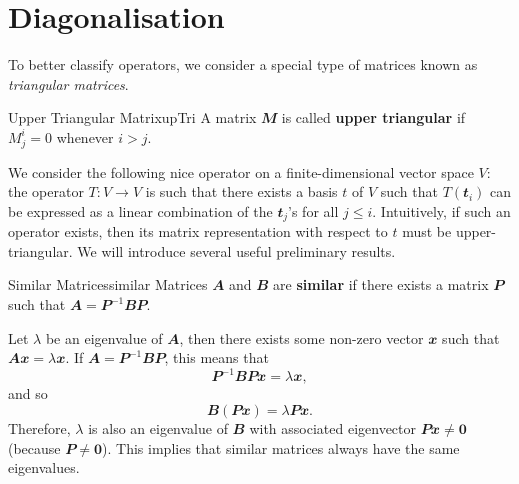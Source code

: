 \documentclass[math]{amznotes}
\theoremstyle{remark}
\newcommand{\zero}{\mathbf{0}}
\begin{document}
\section{Diagonalisation}
To better classify operators, we consider a special type of matrices known as \textit{triangular matrices}.
\begin{dfnbox}{Upper Triangular Matrix}{upTri}
    A matrix $\mathbfit{M}$ is called {\color{red} \textbf{upper triangular}} if $M^i_j = 0$ whenever $i > j$.
\end{dfnbox}
We consider the following nice operator on a finite-dimensional vector space $V$: the operator $T \colon V \to V$ is such that there exists a basis $t$ of $V$ such that $T(\mathbfit{t}_i)$ can be expressed as a linear combination of the $\mathbfit{t}_j$'s for all $j \leq i$. Intuitively, if such an operator exists, then its matrix representation with respect to $t$ must be upper-triangular. We will introduce several useful preliminary results.
\begin{dfnbox}{Similar Matrices}{similar}
    Matrices $\mathbfit{A}$ and $\mathbfit{B}$ are {\color{red} \textbf{similar}} if there exists a matrix $\mathbfit{P}$ such that $\mathbfit{A} = \mathbfit{P}^{-1}\mathbfit{B}\mathbfit{P}$.
\end{dfnbox}
Let $\lambda$ be an eigenvalue of $\mathbfit{A}$, then there exists some non-zero vector $\mathbfit{x}$ such that $\mathbfit{Ax} = \lambda\mathbfit{x}$. If $\mathbfit{A} = \mathbfit{P}^{-1}\mathbfit{B}\mathbfit{P}$, this means that 
\begin{equation*}
    \mathbfit{P}^{-1}\mathbfit{B}\mathbfit{P}\mathbfit{x} = \lambda\mathbfit{x},
\end{equation*}
and so 
\begin{equation*}
    \mathbfit{B}(\mathbfit{Px}) = \lambda\mathbfit{Px}.
\end{equation*}
Therefore, $\lambda$ is also an eigenvalue of $\mathbfit{B}$ with associated eigenvector $\mathbfit{Px} \neq \zero$ (because $\mathbfit{P} \neq \zero$). This implies that similar matrices always have the same eigenvalues.
\end{document}
